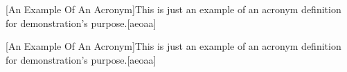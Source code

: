 

[An Example Of An Acronym]{This is just an example of an acronym definition for demonstration's purpose.}[aeoaa]

[An Example Of An Acronym]{This is just an example of an acronym definition for demonstration's purpose.}[aeoaa]
